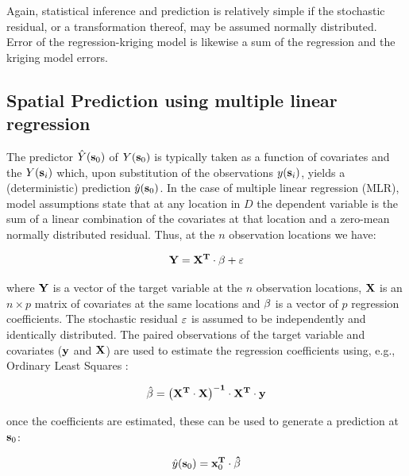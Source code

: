 \documentclass[11pt]{krantz}
\theoremstyle{definition}
\theoremstyle{definition}
\theoremstyle{definition}
\theoremstyle{remark}
\begin{document}
Again, statistical inference and prediction is relatively simple if the
stochastic residual, or a transformation thereof, may be assumed
normally distributed. Error of the regression-kriging model is likewise
a sum of the regression and the kriging model errors.

\hypertarget{spatial-prediction-using-multiple-linear-regression}{%
\subsection{Spatial Prediction using multiple linear
regression}\label{spatial-prediction-using-multiple-linear-regression}}

The predictor \(\hat Y({{\bf s}_0})\) of \(Y({{\bf s}_0})\) is typically
taken as a function of covariates and the \(Y({\bf s}_i)\) which, upon
substitution of the observations \(y({\bf s}_i)\), yields a
(deterministic) prediction \(\hat y({{\bf s}_0})\). In the case of
multiple linear regression (MLR), model assumptions state that at any
location in \(D\) the dependent variable is the sum of a linear
combination of the covariates at that location and a zero-mean normally
distributed residual. Thus, at the \(n\) observation locations we have:

\begin{equation}
{\bf Y} = {\bf X}^{{\bf T}} \cdot {\bf \beta} + {\bf \varepsilon}
\label{eq:lm}
\end{equation}

where \({\bf Y}\) is a vector of the target variable at the \(n\)
observation locations, \({\bf X}\) is an \(n \times p\) matrix of
covariates at the same locations and \({\bf \beta}\) is a vector of
\(p\) regression coefficients. The stochastic residual
\({\bf \varepsilon}\) is assumed to be independently and identically
distributed. The paired observations of the target variable and
covariates (\({\bf y}\) and \({\bf X}\)) are used to estimate the
regression coefficients using, e.g., Ordinary Least Squares
\citep{Kutner2004McGraw}:

\begin{equation}
\hat{{\bf \beta}}  = \left( {{{\bf X}}^{{\bf T}} \cdot {{\bf X}}} \right)^{ - {{\bf 1}}} \cdot
{{\bf X}}^{{\bf T}} \cdot {{\bf y}}
\label{eq:ols-betas}
\end{equation}

once the coefficients are estimated, these can be used to generate a
prediction at \({\bf s}_0\):

\begin{equation}
\hat y({\bf s}_0) = {\bf x}_0^{\bf T} \cdot {\bf \hat \beta}
\end{equation}
\end{document}
